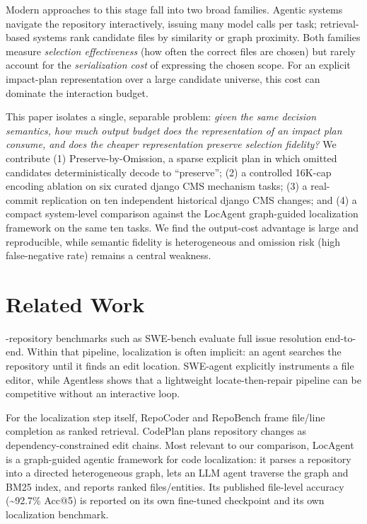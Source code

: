 Modern approaches to this stage fall into two broad families. Agentic systems
\cite{chen2025locagent,yang2024sweagent,xia2024agentless} navigate the
repository interactively, issuing many model calls per task; retrieval-based
systems \cite{zhang2023repocoder,tian2024repobench} rank candidate files by
similarity or graph proximity. Both families measure \emph{selection
effectiveness} (how often the correct files are chosen) but rarely account for
the \emph{serialization cost} of expressing the chosen scope. For an explicit
impact-plan representation over a large candidate universe, this cost can
dominate the interaction budget.

This paper isolates a single, separable problem: \emph{given the same decision
semantics, how much output budget does the representation of an impact plan
consume, and does the cheaper representation preserve selection fidelity?} We
contribute (1) Preserve-by-Omission, a sparse explicit plan in which omitted
candidates deterministically decode to ``preserve''; (2) a controlled
16K-cap encoding ablation on six curated django CMS mechanism tasks; (3) a
real-commit replication on ten independent historical django CMS changes; and
(4) a compact system-level comparison against the LocAgent graph-guided
localization framework on the same ten tasks. We find the output-cost
advantage is large and reproducible, while semantic fidelity is
heterogeneous and omission risk (high false-negative rate) remains a central
weakness.

\section{Related Work}
-repository benchmarks such as SWE-bench
\cite{jimenez2024swebench} evaluate full issue resolution end-to-end. Within
that pipeline, localization is often implicit: an agent searches the
repository until it finds an edit location. SWE-agent \cite{yang2024sweagent}
explicitly instruments a file editor, while Agentless \cite{xia2024agentless}
shows that a lightweight locate-then-repair pipeline can be competitive without
an interactive loop.

For the localization step itself, RepoCoder \cite{zhang2023repocoder} and
RepoBench \cite{tian2024repobench} frame file/line completion as ranked
retrieval. CodePlan \cite{bairi2023codeplan} plans repository changes as
dependency-constrained edit chains. Most relevant to our comparison, LocAgent
\cite{chen2025locagent} is a graph-guided agentic framework for code
localization: it parses a repository into a directed heterogeneous graph, lets
an LLM agent traverse the graph and BM25 index, and reports ranked
files/entities. Its published file-level accuracy (\textasciitilde92.7\%
Acc@5) is reported on its own fine-tuned checkpoint and its own localization
benchmark.

